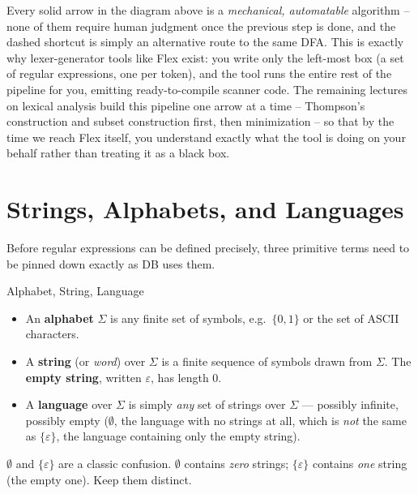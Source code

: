 \documentclass[full-course-notes.tex]{subfiles}
\begin{document}
\begin{coreidea}
Every solid arrow in the diagram above is a \emph{mechanical, automatable} algorithm -- none of
them require human judgment once the previous step is done, and the dashed shortcut is simply
an alternative route to the same DFA. This is exactly why lexer-generator tools like Flex exist:
you write only the left-most box (a set of regular expressions, one per token), and the tool
runs the entire rest of the pipeline for you, emitting ready-to-compile scanner code. The
remaining lectures on lexical analysis build this pipeline one arrow at a time -- Thompson's
construction and subset construction first, then minimization -- so that by the time we reach
Flex itself, you understand exactly what the tool is doing on your behalf rather than treating
it as a black box.
\end{coreidea}

\section{Strings, Alphabets, and Languages}
\label{sec:l4-strings-alphabets-languages}

\dbtag Before regular expressions can be defined precisely, three primitive terms need to be
pinned down exactly as DB uses them.

\begin{defbox}{Alphabet, String, Language}
\begin{itemize}
  \item An \textbf{alphabet} $\Sigma$ is any finite set of symbols, e.g.\ $\{0,1\}$ or the set
  of ASCII characters.
  \item A \textbf{string} (or \emph{word}) over $\Sigma$ is a finite sequence of symbols drawn
  from $\Sigma$. The \textbf{empty string}, written $\varepsilon$, has length 0.
  \item A \textbf{language} over $\Sigma$ is simply \emph{any} set of strings over $\Sigma$ ---
  possibly infinite, possibly empty ($\emptyset$, the language with no strings at all, which is
  \emph{not} the same as $\{\varepsilon\}$, the language containing only the empty string).
\end{itemize}
\end{defbox}

\begin{examfocus}
$\emptyset$ and $\{\varepsilon\}$ are a classic confusion. $\emptyset$ contains \emph{zero}
strings; $\{\varepsilon\}$ contains \emph{one} string (the empty one). Keep them distinct.
\end{examfocus}
\end{document}
